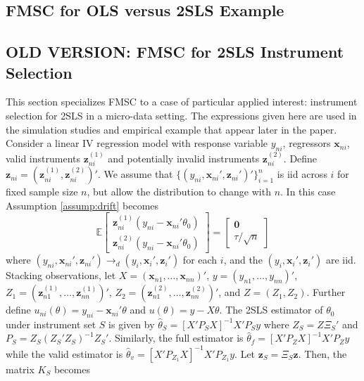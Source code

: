 \documentclass[12pt]{article}
\newcommand{\expect}{\mathbb{E}}
\theoremstyle{definition}
\begin{document}
\subsection{FMSC for OLS versus 2SLS Example}

\subsection{OLD VERSION: FMSC for 2SLS Instrument Selection}\label{sec:2sls}
This section specializes FMSC to a case of particular applied interest: instrument selection for 2SLS in a micro-data setting. The expressions given here are used in the simulation studies and empirical example that appear later in the paper. Consider a linear IV regression model with response variable $y_{ni}$, regressors $\mathbf{x}_{ni}$, valid instruments $\mathbf{z}^{(1)}_{ni}$ and potentially invalid instruments $\mathbf{z}^{(2)}_{ni}$. Define $\mathbf{z}_{ni} = (\mathbf{z}^{(1)}_{ni},\mathbf{z}^{(2)}_{ni})'$. We assume that $\{(y_{ni}, \mathbf{x}_{ni}',\mathbf{z}_{ni}')'\}_{i=1}^n$ is iid across $i$ for fixed sample size $n$, but allow the distribution to change with $n$.
In this case Assumption \ref{assump:drift} becomes
\begin{equation}
\label{eq:linear}
	\expect\left[\begin{array}{c} \mathbf{z}^{(1)}_{ni} \left(y_{ni} - \mathbf{x}_{ni}' \theta_0  \right)  \\ \mathbf{z}^{(2)}_{ni} \left(y_{ni} - \mathbf{x}_{ni}' \theta_0  \right) \end{array}  \right] = \left[\begin{array}{c} \mathbf{0}\\ \tau/\sqrt{n}  \end{array}\right]
\end{equation}
where $(y_{ni},\mathbf{x}_{ni}',\mathbf{z}_{ni}')\rightarrow_d(y_i,\mathbf{x}_{i}',\mathbf{z}_{i}')$ for each $i$, and the $(y_i,\mathbf{x}_{i}',\mathbf{z}_{i}')$ are iid. Stacking observations, let $X = \left(\mathbf{x}_{n1}, \hdots, \mathbf{x}_{nn} \right)'$, $y = \left( y_{n1}, \hdots, y_{nn}\right)'$, $Z_1 = (\mathbf{z}^{(1)}_{n1}, \hdots, \mathbf{z}^{(1)}_{nn} )'$, $Z_2 = (\mathbf{z}^{(2)}_{n1}, \hdots, \mathbf{z}^{(2)}_{nn})'$, and $Z = (Z_1, Z_2)$. Further define $u_{ni}(\theta) = y_{ni} - \mathbf{x}_{ni}'\theta$ and $u(\theta) = y - X\theta$. The 2SLS estimator of $\theta_0$ under instrument set $S$ is given by $\widehat{\theta}_{S} = \left[X'P_SX\right]^{-1} X'P_S y$ where $Z_S = Z\Xi_S'$ and $P_S = Z_S(Z_S'Z_S)^{-1}Z_S'$. Similarly, the full estimator is $\widehat{\theta}_{f} = \left[X' P_Z X\right]^{-1} X' P_Z y$ while the valid estimator is $\widehat{\theta}_{v} = \left[X' P_{Z_1} X\right]^{-1} X' P_{Z_1}y$. Let $\mathbf{z}_S = \Xi_S \mathbf{z}$. Then, the matrix $K_S$ becomes
\end{document}
